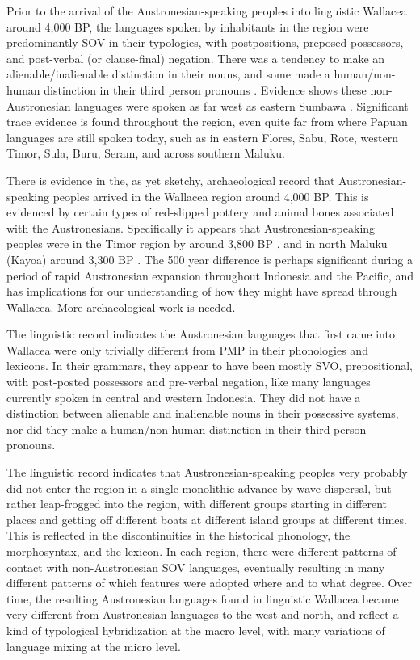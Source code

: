 Prior to the arrival of the Austronesian-speaking peoples into
linguistic Wallacea around 4,000 BP,
the languages spoken by inhabitants in the region were predominantly
SOV in their typologies,
with postpositions, preposed possessors,
and post-verbal (or clause-final) negation.
There was a tendency to make an alienable/inalienable distinction
in their nouns, and some made a human/non-human distinction in their third person
pronouns
\citep{Klamer2019,KlamerReesinkVanStaden2008,Reesink2002b,ReesinkDunn2018}.
Evidence shows these non-Austronesian languages were spoken as
far west as eastern Sumbawa \citep{Donohue2007}.
Significant trace evidence is found throughout the region,
even quite far from where Papuan languages are still spoken today,
such as in eastern Flores,
Sabu, Rote, western Timor, Sula,
Buru, Seram, and across southern Maluku.

There is evidence in the, as yet sketchy, archaeological record
that Austronesian-speaking peoples arrived in the Wallacea
region around 4,000 BP.
This is evidenced by certain types of red-slipped pottery
and animal bones associated with the Austronesians.
Specifically it appears that Austronesian-speaking peoples were
in the Timor region by around 3,800 BP \citep{Spriggs2011},
and in north Maluku (Kayoa) around 3,300 BP \citep{Bellwood2019a}.
The 500 year difference is perhaps significant during a period
of rapid Austronesian expansion throughout Indonesia
and the Pacific, and has implications for our understanding of
how they might have spread through Wallacea.
More archaeological work is needed.

The linguistic record indicates the Austronesian languages that
first came into Wallacea were only trivially different from
PMP in their phonologies and lexicons.
In their grammars, they appear to have been mostly SVO,
prepositional, with post-posted possessors
and pre-verbal negation, like many languages currently spoken
in central and western Indonesia.
They did not have a distinction between alienable
and inalienable nouns in their possessive systems,
nor did they make a human/non-human distinction in their third person pronouns.

The linguistic record indicates that Austronesian-speaking peoples
very probably did not enter the region in a single monolithic
advance-by-wave dispersal, but rather leap-frogged into the region,
with different groups starting in different places
and getting off different boats at different island groups at different times.
This is reflected in the discontinuities in the historical phonology,
the morphosyntax, and the lexicon.
In each region, there were different patterns of contact with
non-Austronesian SOV languages, eventually resulting in many different patterns of which features
were adopted where and to what degree.
Over time, the resulting Austronesian languages found in linguistic
Wallacea became very different from Austronesian languages to
the west and north, and reflect a kind of typological hybridization at
the macro level, with many variations of language mixing at the micro level.

